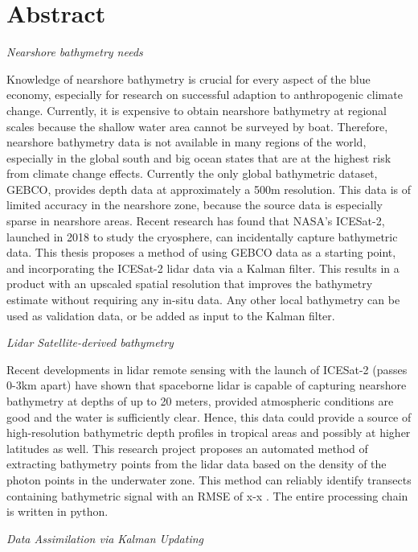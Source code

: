 \chapter*{Abstract}
\noindent\emph{Nearshore bathymetry needs}

Knowledge of nearshore bathymetry is crucial for every aspect of the blue economy, especially for research on successful adaption to anthropogenic climate change. Currently, it is expensive to obtain nearshore bathymetry at regional scales because the shallow water area cannot be surveyed by boat. Therefore, nearshore bathymetry data is not available in many regions of the world, especially in the global south and big ocean states that are at the highest risk from climate change effects. Currently the only global bathymetric dataset, GEBCO, provides depth data at approximately a 500m resolution. This data is of limited accuracy in the nearshore zone, because the source data is especially sparse in nearshore areas. Recent research has found that NASA's ICESat-2, launched in 2018 to study the cryosphere, can incidentally capture bathymetric data. This thesis proposes a method of using GEBCO data as a starting point, and incorporating the ICESat-2 lidar data via a Kalman filter. This results in a product with an upscaled spatial resolution that improves the bathymetry estimate without requiring any in-situ data. Any other local bathymetry can be used as validation data, or be added as input to the Kalman filter. 

\noindent\emph{Lidar Satellite-derived bathymetry}

Recent developments in lidar remote sensing with the launch of ICESat-2 (passes 0-3km apart) have shown that spaceborne lidar is capable of capturing nearshore bathymetry at depths of up to 20 meters, provided atmospheric conditions are good and the water is sufficiently clear. Hence, this data could provide a source of high-resolution bathymetric depth profiles in tropical areas and possibly at higher latitudes as well. This research project proposes an automated method of extracting bathymetry points from the lidar data based on the density of the photon points in the underwater zone. This method can reliably identify transects containing bathymetric signal with an RMSE of x-x . The entire processing chain is written in python. 


\noindent\emph{Data Assimilation via Kalman Updating}

